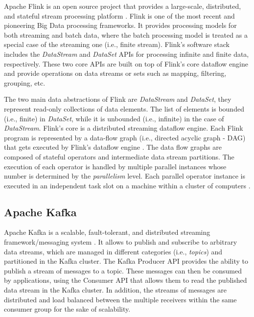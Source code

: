 \par Apache Flink is an open source project that provides a large-scale, distributed, and stateful stream processing platform \cite{carbone2015apache}. Flink is one of the most recent and pioneering Big Data processing frameworks. It provides processing models for both streaming and batch data, where the batch processing model is treated as a special case of the streaming one (i.e., finite stream). Flink's software stack includes the \textit{DataStream} and \textit{DataSet} APIs for processing infinite and finite data, respectively. These two core APIs are built on top of Flink's core dataflow engine and provide operations on data streams or sets such as mapping, filtering, grouping, etc.

\par The two main data abstractions of Flink are \textit{DataStream} and \textit{DataSet},  they represent read-only collections of data elements. The list of elements is bounded (i.e., finite) in \textit{DataSet}, while it is unbounded (i.e., infinite) in the case of \textit{DataStream}. Flink's core is a distributed streaming dataflow engine. Each
Flink program is represented by a data-flow graph (i.e., directed acyclic graph - DAG) that gets executed by Flink's dataflow engine \cite{carbone2015apache}. The data flow graphs are composed of stateful operators and intermediate data stream partitions.  The execution of each operator is handled by multiple parallel instances whose number is determined by the \textit{parallelism} level. Each parallel operator instance is executed in an independent task slot on a machine within a cluster of computers \cite{Flink}.    

\subsection{Apache Kafka}

\par Apache Kafka is a scalable, fault-tolerant, and distributed streaming framework/messaging system \cite{Kafka}. It allows to publish and subscribe to arbitrary data streams, which are managed in different categories (i.e., \textit{topics}) and  partitioned in the Kafka cluster. The Kafka Producer API provides the ability to publish a stream of messages to a topic. These messages can then be consumed by applications, using the Consumer API that allows them to read the published data stream in the Kafka cluster. In addition, the streams of messages are distributed and load balanced between the multiple receivers within the same consumer group for the sake of scalability.
  





